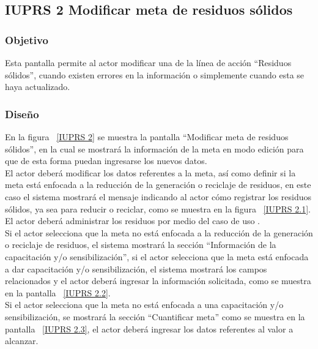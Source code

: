 \subsection{IUPRS 2 Modificar meta de residuos sólidos}
                     
\subsubsection{Objetivo}

   Esta pantalla permite al actor modificar una  de la línea de acción ``Residuos sólidos'', cuando existen errores en la información o simplemente cuando esta se haya actualizado.

	
\subsubsection{Diseño}
  En la figura ~\ref{IUPRS 2} se muestra la pantalla ``Modificar meta de residuos sólidos'', en la cual se mostrará la información de la meta en modo edición para que
  de esta forma puedan ingresarse los nuevos datos.\\

  El actor deberá modificar los datos referentes a la meta, así como definir si la meta está enfocada a la reducción de la generación o reciclaje de residuos, en este caso el sistema mostrará el mensaje 
  indicando al actor cómo registrar los residuos sólidos, ya sea para reducir o reciclar, como se muestra en la figura ~\ref{IUPRS 2.1}.\\
  
  El actor deberá administrar los residuos por medio del caso de uso .\\
  
  Si el actor selecciona que la meta no está enfocada a la reducción de la generación o reciclaje de residuos, el sistema mostrará la sección ``Información de la capacitación y/o sensibilización'',
  si el actor selecciona que la meta está enfocada a dar capacitación y/o sensibilización, el sistema mostrará los campos relacionados y
  el actor deberá ingresar la información solicitada, como se muestra en la pantalla ~\ref{IUPRS 2.2}.\\
  
  Si el actor selecciona que la meta no está enfocada a una capacitación y/o sensibilización, se mostrará la sección ``Cuantificar meta'' como se muestra en la pantalla ~\ref{IUPRS 2.3}, el actor 
  deberá ingresar los datos referentes al valor a alcanzar.\\
 	\newpage
  	\newpage
  	
